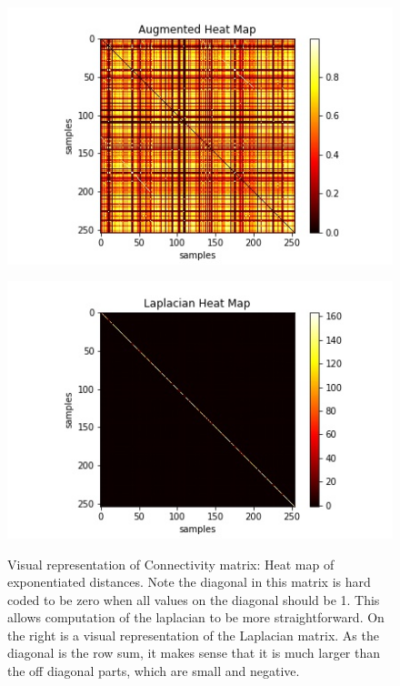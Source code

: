 \documentclass{article}
\theoremstyle{definition} \newtheorem*{lte}{Definition}
\theoremstyle{plain} \newtheorem*{csbt}{Theorem}
\begin{document}
\begin{figure}[H]
\begin{center}
\begin{subfloat}{
\includegraphics[width = .4\linewidth]{AugmentedHeatMap.jpg}
}\end{subfloat}
\begin{subfloat}{
\includegraphics[width = .4\linewidth]{LaplacianHeatMap.jpg}
}\end{subfloat}
\caption{ Visual representation of Connectivity matrix: Heat map of exponentiated distances. Note the diagonal in this matrix is hard coded to be zero when all values on the diagonal should be 1. This allows computation of the laplacian to be more straightforward. On the right is a visual representation of the Laplacian matrix. As the diagonal is the row sum, it makes sense that it is much larger than the off diagonal parts, which are small and negative. }
\end{center}
\end{figure}
\end{document}
